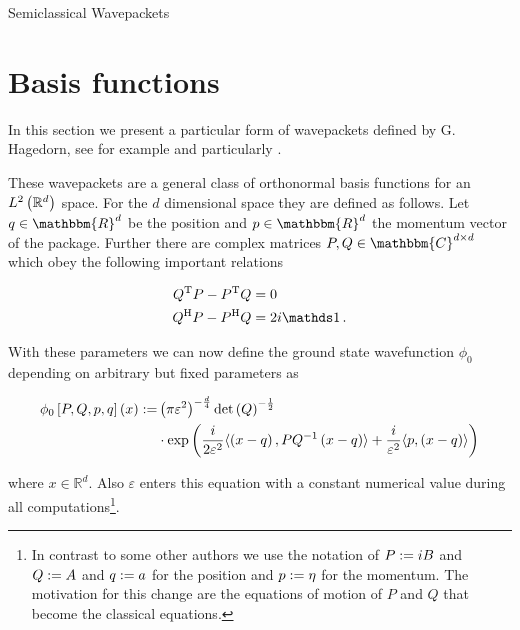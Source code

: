 \begin{chapter}{Semiclassical Wavepackets}
\label{ch:wavepackets}

\section{Basis functions}

In this section we present a particular form of wavepackets defined
by G. Hagedorn, see for example \cite{H_semiclassical_i,H_semiclassical_iii}
and particularly \cite{H_ladder_operators}.

These wavepackets are a general class of orthonormal basis functions for an $L^2\left( \mathbb{R}^d \right)$
space. For the $d$ dimensional space they are defined as follows. Let $q \in \mathbbm{R}^d$
be the position and $p \in \mathbbm{R}^d$ the momentum vector of the package. Further
there are complex matrices $P, Q \in \mathbbm{C}^{d \times d}$ which obey the following
important relations

\begin{equation} \label{eq:symplecticity_condition}
\begin{split}
  Q\T P - P\T Q & = 0 \\
  Q\herm P - P\herm Q & = 2 i \id  \,.
\end{split}
\end{equation}

With these parameters we can now define the ground state wavefunction $\phi_0$
depending on arbitrary but fixed parameters as

\begin{equation} \label{eq:hagedorn_groundstate_dd}
\begin{split}
  \phi_0 \left[ P,Q,p,q \right] \left( x \right)
  := &
  \left(\pi\varepsilon^2\right)^{-\frac{d}{4}} \det\left(Q\right)^{-\frac{1}{2}} \\
  & \cdot \exp \left(
      \frac{i}{2\varepsilon^2} \langle \left(x-q\right) , PQ^{-1}\left(x-q\right) \rangle
      + \frac{i}{\varepsilon^2} \langle p , \left(x-q\right) \rangle
  \right)
\end{split}
\end{equation}

where $x \in \mathbb{R}^d$. Also $\varepsilon$ enters this equation with a constant
numerical value during all computations\footnote{
In contrast to some other authors we use the notation of $P := iB$ and $Q := A$
and $q := a$ for the position and $p := \eta$ for the momentum. The motivation
for this change are the equations of motion of $P$ and $Q$ that become the
classical equations.}.


\end{chapter}
